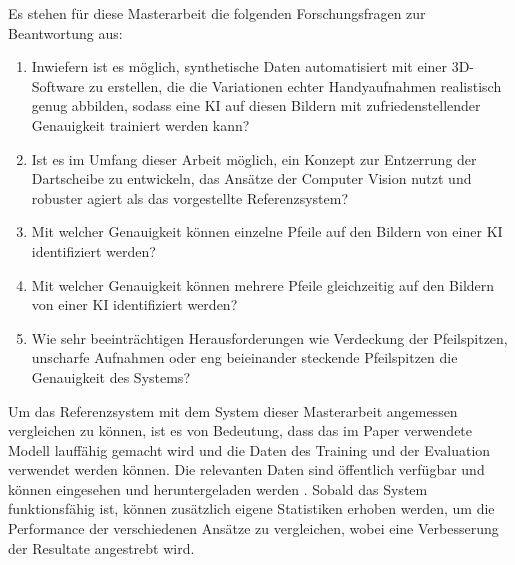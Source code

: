 Es stehen für diese Masterarbeit die folgenden Forschungsfragen zur Beantwortung aus:

\begin{enumerate}
    \item Inwiefern ist es möglich, synthetische Daten automatisiert mit einer 3D-Software zu erstellen, die die Variationen echter Handyaufnahmen realistisch genug abbilden, sodass eine KI auf diesen Bildern mit zufriedenstellender Genauigkeit trainiert werden kann?
    \item Ist es im Umfang dieser Arbeit möglich, ein Konzept zur Entzerrung der Dartscheibe zu entwickeln, das Ansätze der Computer Vision nutzt und robuster agiert als das vorgestellte Referenzsystem?
    \item Mit welcher Genauigkeit können einzelne Pfeile auf den Bildern von einer KI identifiziert werden?
    \item Mit welcher Genauigkeit können mehrere Pfeile gleichzeitig auf den Bildern von einer KI identifiziert werden?
    \item Wie sehr beeinträchtigen Herausforderungen wie Verdeckung der Pfeilspitzen, unscharfe Aufnahmen oder eng beieinander steckende Pfeilspitzen die Genauigkeit des Systems?
\end{enumerate}

Um das Referenzsystem mit dem System dieser Masterarbeit angemessen vergleichen zu können, ist es von Bedeutung, dass das im Paper verwendete Modell lauffähig gemacht wird und die Daten des Training und der Evaluation verwendet werden können. Die relevanten Daten sind öffentlich verfügbar und können eingesehen und heruntergeladen werden \cite{deepdarts-data}. Sobald das System funktionsfähig ist, können zusätzlich eigene Statistiken erhoben werden, um die Performance der verschiedenen Ansätze zu vergleichen, wobei eine Verbesserung der Resultate angestrebt wird.

\iffalse

